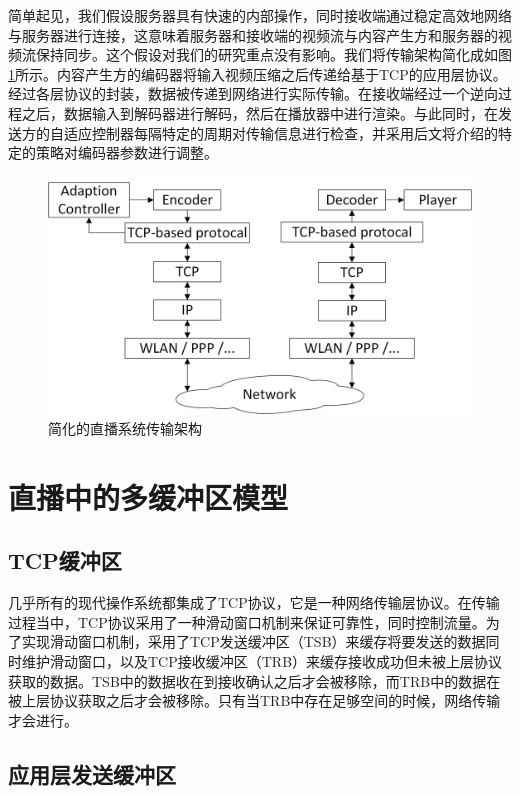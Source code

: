 简单起见，我们假设服务器具有快速的内部操作，同时接收端通过稳定高效地网络与服务器进行连接，这意味着服务器和接收端的视频流与内容产生方和服务器的视频流保持同步。这个假设对我们的研究重点没有影响。我们将传输架构简化成如图\ref{fig:08}所示。内容产生方的编码器将输入视频压缩之后传递给基于TCP的应用层协议。经过各层协议的封装，数据被传递到网络进行实际传输。在接收端经过一个逆向过程之后，数据输入到解码器进行解码，然后在播放器中进行渲染。与此同时，在发送方的自适应控制器每隔特定的周期对传输信息进行检查，并采用后文将介绍的特定的策略对编码器参数进行调整。

\begin{figure}[h]
	\centering
	\includegraphics[width = 0.9\linewidth]{clip/08.png}
	\caption{简化的直播系统传输架构\label{fig:08}}
\end{figure}

\section{直播中的多缓冲区模型}

\subsection{TCP缓冲区}

几乎所有的现代操作系统都集成了TCP协议，它是一种网络传输层协议。在传输过程当中，TCP协议采用了一种滑动窗口机制来保证可靠性，同时控制流量。为了实现滑动窗口机制，采用了TCP发送缓冲区（TSB）来缓存将要发送的数据同时维护滑动窗口，以及TCP接收缓冲区（TRB）来缓存接收成功但未被上层协议获取的数据。TSB中的数据收在到接收确认之后才会被移除，而TRB中的数据在被上层协议获取之后才会被移除。只有当TRB中存在足够空间的时候，网络传输才会进行。

\subsection{应用层发送缓冲区}

